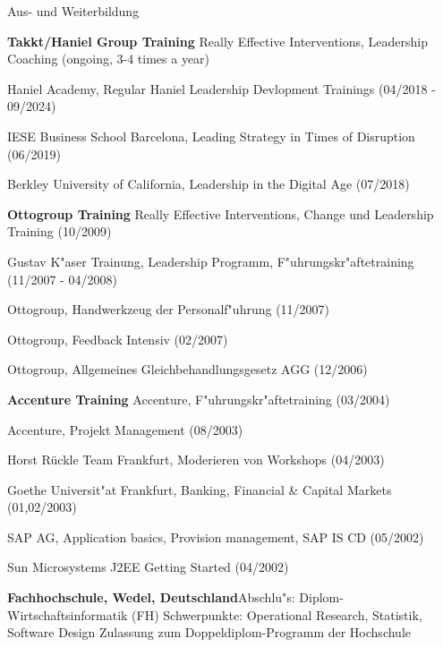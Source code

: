 \begin{rubric}{Aus- und Weiterbildung}

\entry*[01/2018--9/2024] \textbf{Takkt/Haniel Group Training}\newline
Really Effective Interventions, Leadership Coaching (ongoing, 3-4 times a year)

Haniel Academy, Regular Haniel Leadership Devlopment Trainings (04/2018 - 09/2024)

IESE Business School Barcelona, Leading Strategy in Times of Disruption (06/2019)

Berkley University of California, Leadership in the Digital Age (07/2018)


\entry*[01/2005--10/2009] \textbf{Ottogroup Training}\newline
Really Effective Interventions, Change und Leadership Training (10/2009)

Gustav K"aser Trainung, Leadership Programm, F"uhrungskr"aftetraining (11/2007 - 04/2008)

Ottogroup, Handwerkzeug der Personalf"uhrung (11/2007)

Ottogroup, Feedback Intensiv (02/2007)

Ottogroup, Allgemeines Gleichbehandlungsgesetz AGG (12/2006)



\entry*[04/2002--12/2004] \textbf{Accenture Training}\newline
Accenture, F"uhrungskr"aftetraining (03/2004)

Accenture, Projekt Management (08/2003)

Horst R\"u{}ckle Team Frankfurt, Moderieren von Workshops (04/2003)

Goethe Universit"at Frankfurt, Banking, Financial \& Capital Markets (01,02/2003)

SAP AG, Application basics, Provision management, SAP IS CD (05/2002)

Sun Microsystems J2EE Getting Started (04/2002)

\entry*[04/1997--09/2001] \textbf{Fachhochschule, Wedel, Deutschland}\newline Abschlu"s: Diplom-Wirtschaftsinformatik (FH) \newline Schwerpunkte: Operational Research, Statistik, Software Design \newline Zulassung zum Doppeldiplom-Programm der Hochschule


\end{rubric}
